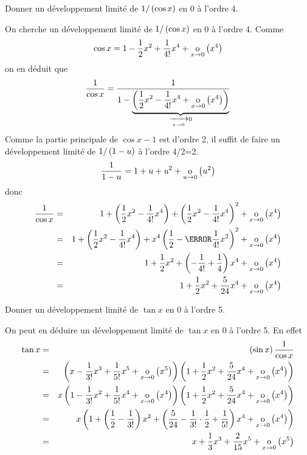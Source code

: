 \documentclass{magnolia}
\begin{document}
\begin{exos}
\exo Donner un développement limité de $1/\left(\cos x\right)$ en 0 à l'ordre 4.
  \begin{sol}
  On cherche un développement limité de $1/\left(\cos x\right)$ en 0 à l'ordre 4.
  Comme
  \[\cos x=1-\frac{1}{2}x^2+\frac{1}{4!}x^4+\underset{x \rightarrow 0}{\text{o}}\left(x^4\right)\]
  on en déduit que
  \[\frac{1}{\cos x}
    =\frac{1}{1-\underbrace{\p{\frac{1}{2}x^2-\frac{1}{4!}x^4+%
      \petitozero{x}{x^4}}}_{\tendvers{x}{0}0}}\]
  Comme la partie principale de $\cos x-1$ est d'ordre 2, il suffit de faire un
  développement limité de $1/\left(1-u\right)$ à l'ordre 4/2=2.
  \[\frac{1}{1-u}=1+u+u^2+\underset{u \rightarrow 0}{\text{o}}\left(u^2\right)\]
  donc
  \begin{eqnarray*}
  \frac{1}{\cos x}
  &=& 1+\p{\frac{1}{2}x^2-\frac{1}{4!}x^4}+\p{\frac{1}{2}x^2-\frac{1}{4!}x^4}^2
      +\petitozero{x}{x^4}\\
  &=& 1+\p{\frac{1}{2}x^2-\frac{1}{4!}x^4}+x^4\p{\frac{1}{2}-%
      \cancel{\frac{1}{4!}x^2}}^2
      +\petitozero{x}{x^4}\\
  &=& 1+\frac{1}{2}x^2+\p{-\frac{1}{4!}+\frac{1}{4}}x^4+\petitozero{x}{x^4}\\
  &=& 1+\frac{1}{2}x^2+\frac{5}{24}x^4+\petitozero{x}{x^4}
  \end{eqnarray*}    
  \end{sol}
\exo Donner un développement limité de $\tan x$ en 0
  à l'ordre 5.
  \begin{sol}
  On peut en déduire un développement limité de $\tan x$ en 0
  à l'ordre 5. En effet
  \begin{eqnarray*}
  \tan x
  &=& \left(\sin x\right)\frac{1}{\cos x}\\
  &=& \left(x-\frac{1}{3!}x^3+\frac{1}{5!}x^5+\underset{x \rightarrow 0}{\text{o}}\left(x^5\right)\right)
      \left(1+\frac{1}{2}x^2+\frac{5}{24}x^4+\underset{x \rightarrow 0}{\text{o}}\left(x^4\right)\right)\\
  &=& x \left(1-\frac{1}{3!}x^2+\frac{1}{5!}x^4+\underset{x \rightarrow 0}{\text{o}}\left(x^4\right)\right)
      \left(1+\frac{1}{2}x^2+\frac{5}{24}x^4+\underset{x \rightarrow 0}{\text{o}}\left(x^4\right)\right)\\
  &=& x\left(1+\left(\frac{1}{2}-\frac{1}{3!}\right)x^2+
      \left(\frac{5}{24}-\frac{1}{3!}\cdot\frac{1}{2}+\frac{1}{5!}\right)x^4
      +\underset{x \rightarrow 0}{\text{o}}\left(x^4\right)\right)\\
  &=& x+\frac{1}{3}x^3+\frac{2}{15}x^5+\underset{x \rightarrow 0}{\text{o}}\left(x^5\right)
  \end{eqnarray*}    
  \end{sol}
\end{exos}
\end{document}
